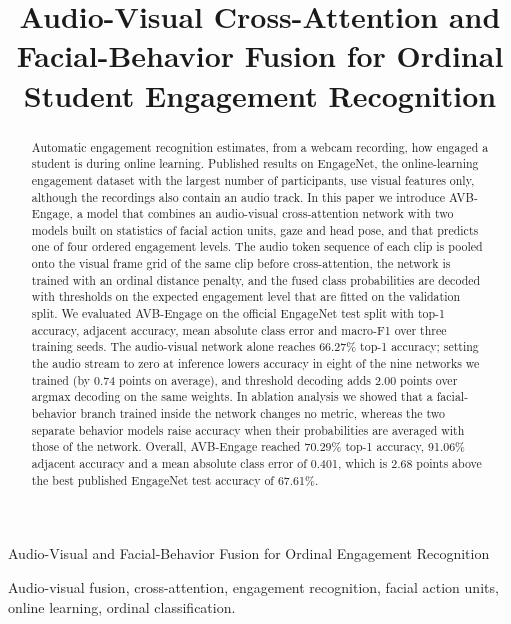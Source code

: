\documentclass[journal]{IEEEtran}
\newcommand{\ournet}{AVB-Engage}
\begin{document}
\title{Audio-Visual Cross-Attention and Facial-Behavior Fusion for Ordinal Student Engagement Recognition}

\author{}

%
{Audio-Visual and Facial-Behavior Fusion for Ordinal Engagement Recognition}

\maketitle

\begin{abstract}
Automatic engagement recognition estimates, from a webcam recording, how engaged a student is during online learning. Published results on EngageNet, the online-learning engagement dataset with the largest number of participants, use visual features only, although the recordings also contain an audio track. In this paper we introduce \ournet, a model that combines an audio-visual cross-attention network with two models built on statistics of facial action units, gaze and head pose, and that predicts one of four ordered engagement levels. The audio token sequence of each clip is pooled onto the visual frame grid of the same clip before cross-attention, the network is trained with an ordinal distance penalty, and the fused class probabilities are decoded with thresholds on the expected engagement level that are fitted on the validation split. We evaluated \ournet{} on the official EngageNet test split with top-1 accuracy, adjacent accuracy, mean absolute class error and macro-F1 over three training seeds. The audio-visual network alone reaches 66.27\% top-1 accuracy; setting the audio stream to zero at inference lowers accuracy in eight of the nine networks we trained (by 0.74 points on average), and threshold decoding adds 2.00 points over argmax decoding on the same weights. In ablation analysis we showed that a facial-behavior branch trained inside the network changes no metric, whereas the two separate behavior models raise accuracy when their probabilities are averaged with those of the network. Overall, \ournet{} reached 70.29\% top-1 accuracy, 91.06\% adjacent accuracy and a mean absolute class error of 0.401, which is 2.68 points above the best published EngageNet test accuracy of 67.61\%.
\end{abstract}

\begin{IEEEkeywords}
Audio-visual fusion, cross-attention, engagement recognition, facial action units, online learning, ordinal classification.
\end{IEEEkeywords}
\end{document}

